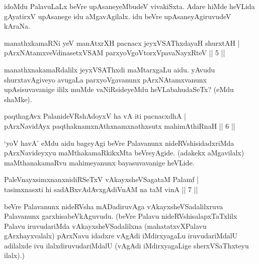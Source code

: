\begin{artha} 
idoMdu PalavuLaLx beVre upAsaneyeMbudeV vivakiSxta. Adare hiMde 
heVLida gAyatirxV upAsanege idu aMgavAgilalx. idu beVre 
upAsaneyAgiruvudeV kAraNa.
\end{artha}


\begin{shl}
manathxkamaRNi yeV manAtxrXH pacnacx jeyxVSAThxdayaH shurxtAH | \\
pArxNAtamxveVdinasetxVSAM parxyoVgoV\s torxVpavaNayxRteV \hfill|| 5 || 
\end{shl}

\begin{artha} 
manathxnakamaRdalilx jeyxVSAThxdi maMtarxgaLu aidu. yAvudu 
shurxtavAgiveyo avugaLa parxyoVgavanunx pArxNAtamxvanunx 
upAsisuvavanige ililx muMde vaNiRsideyeMdu heVLabahudaSeTx? (eMdu 
shaMke).
\end{artha}


\begin{shl}
paqthagAvx PalanideVRshAdoyxV ha vA iti pacnacxdhA | \\
pArxNavidAyx paqthaknamxnAthxnamxnathxsutx mahimAthiRnaH \hfill|| 6 || 
\end{shl}

\begin{artha} 
`yoV havA' eMdu aidu bageyAgi beVre Palavanunx nideRVshisidadxriMda 
pArxNavideyxyu maMthakamaRkikxMta beVreyAgide. (adakekx aMgavilalx) 
maMthanakamaRvu mahimeyanunx bayasuvavanige heVLide.
\end{artha}


\begin{shl}
PaleV\s nayxsimxnanxnidiRSeTxV vAkayxsheVSagataM Palamf | \\
tasimxnasxti hi sadABxvAdAvxgAdiVnAM na taM vinA \hfill|| 7 || 
\end{shl}

\begin{artha} 
beVre Palavanunx nideRVsha mADadiruvAga vAkayxsheVSadalilxruva 
Palavanunx garxhisabeVkAguvudu. (beVre Palavu nideRVshisalapxTaTxlilx 
Palavu iruvudariMda vAkayxsheVSadalilxna (mahatatxvXPalavu 
gArxhayxvalalx) pArxNavu idadxre vAgAdi iMdirxyagaLu iruvudariMdalU 
adilalxde ivu ilalxdiruvudariMdalU (vAgAdi iMdirxyagaLige 
sherxVSaThxteyu ilalx).)
\end{artha}

